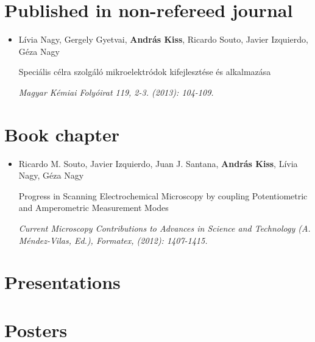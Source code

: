 \section*{Published in non-refereed journal}
\begin{itemize}

\item[] Lívia Nagy, Gergely Gyetvai, \textbf{András Kiss}, Ricardo Souto, Javier Izquierdo, Géza Nagy

Speciális célra szolgáló mikroelektródok kifejlesztése és alkalmazása

\emph{Magyar Kémiai Folyóirat 119, 2-3. (2013): 104-109.}
\end{itemize}

\section*{Book chapter}
\begin{itemize}

\item[] Ricardo M. Souto, Javier Izquierdo, Juan J. Santana, \textbf{András Kiss}, Lívia Nagy, Géza Nagy

Progress in Scanning Electrochemical Microscopy by coupling Potentiometric and Amperometric Measurement Modes

\emph{Current Microscopy Contributions to Advances in Science and Technology (A. Méndez-Vilas, Ed.), Formatex, (2012): 1407-1415.}
\end{itemize}


\section*{Presentations}

\section*{Posters}
